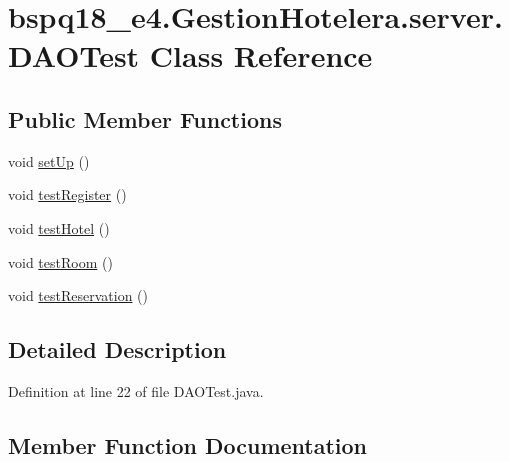 \hypertarget{classbspq18__e4_1_1_gestion_hotelera_1_1server_1_1_d_a_o_test}{}\section{bspq18\+\_\+e4.\+Gestion\+Hotelera.\+server.\+D\+A\+O\+Test Class Reference}
\label{classbspq18__e4_1_1_gestion_hotelera_1_1server_1_1_d_a_o_test}
\subsection*{Public Member Functions}
\begin{DoxyCompactItemize}
\item 
void \mbox{\hyperlink{classbspq18__e4_1_1_gestion_hotelera_1_1server_1_1_d_a_o_test_ab35e6bc177291ca8718ee8dc70cefffa}{set\+Up}} ()
\item 
void \mbox{\hyperlink{classbspq18__e4_1_1_gestion_hotelera_1_1server_1_1_d_a_o_test_a9b683c73b8d32e2b9a350b204930d958}{test\+Register}} ()
\item 
void \mbox{\hyperlink{classbspq18__e4_1_1_gestion_hotelera_1_1server_1_1_d_a_o_test_a5d4348dfc1e027272d824a082bb788b1}{test\+Hotel}} ()
\item 
void \mbox{\hyperlink{classbspq18__e4_1_1_gestion_hotelera_1_1server_1_1_d_a_o_test_a13654c617b96d0fb658bfc00e92901c5}{test\+Room}} ()
\item 
void \mbox{\hyperlink{classbspq18__e4_1_1_gestion_hotelera_1_1server_1_1_d_a_o_test_a03eda2814a0ea3259400c11b6723b1b2}{test\+Reservation}} ()
\end{DoxyCompactItemize}


\subsection{Detailed Description}


Definition at line 22 of file D\+A\+O\+Test.\+java.



\subsection{Member Function Documentation}
\mbox{\label{classbspq18__e4_1_1_gestion_hotelera_1_1server_1_1_d_a_o_test_ab35e6bc177291ca8718ee8dc70cefffa}} 
